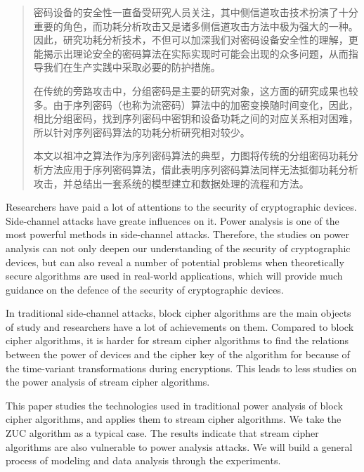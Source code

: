 
\begin{abstract}

密码设备的安全性一直备受研究人员关注，其中侧信道攻击技术扮演了十分重要的角色，而功耗分析攻击又是诸多侧信道攻击方法中极为强大的一种。因此，研究功耗分析技术，不但可以加深我们对密码设备安全性的理解，更能揭示出理论安全的密码算法在实际实现时可能会出现的众多问题，从而指导我们在生产实践中采取必要的防护措施。

在传统的旁路攻击中，分组密码是主要的研究对象，这方面的研究成果也较多。由于序列密码（也称为流密码）算法中的加密变换随时间变化，因此，相比分组密码，找到序列密码中密钥和设备功耗之间的对应关系相对困难，所以针对序列密码算法的功耗分析研究相对较少。

本文以祖冲之算法作为序列密码算法的典型，力图将传统的分组密码功耗分析方法应用于序列密码算法，借此表明序列密码算法同样无法抵御功耗分析攻击，并总结出一套系统的模型建立和数据处理的流程和方法。

\end{abstract}

\begin{englishabstract}
Researchers have paid a lot of attentions to the security of cryptographic devices. Side-channel attacks have greate influences on it. Power analysis is one of the most powerful methods in side-channel attacks. Therefore, the studies on power analysis can not only deepen our understanding of the security of cryptographic devices, but can also reveal a number of potential problems when theoretically secure algorithms are used in real-world applications, which will provide much guidance on the defence of the security of cryptographic devices.

In traditional side-channel attacks, block cipher algorithms are the main objects of study and researchers have a lot of achievements on them. Compared to block cipher algorithms, it is harder for stream cipher algorithms to find the relations between the power of devices and the cipher key of the algorithm for because of the time-variant transformations during encryptions. This leads to less studies on the power analysis of stream cipher algorithms.

This paper studies the technologies used in traditional power analysis of block cipher algorithms, and applies them to stream cipher algorithms. We take the ZUC algorithm as a typical case. The results indicate that stream cipher algorithms are also vulnerable to power analysis attacks. We will build a general process of modeling and data analysis through the experiments.

\end{englishabstract}


